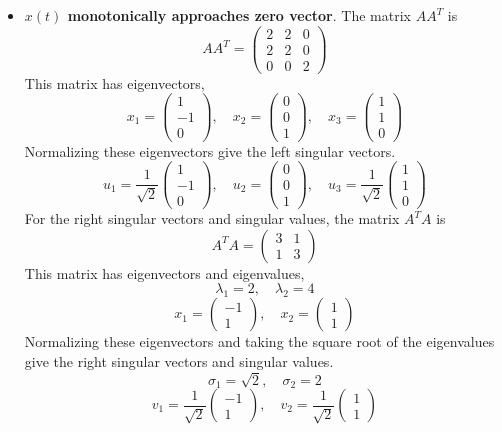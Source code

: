 \documentclass{article}
\begin{document}
\begin{itemize}
  \item {\bf $x(t)$ monotonically approaches zero vector}. The matrix $A A^T$
  is
  $$ A A^T = \begin{pmatrix}
    2 & 2 & 0 \\
    2 & 2 & 0 \\
    0 & 0 & 2
  \end{pmatrix} $$
  This matrix has eigenvectors,
  $$ x_1 = \begin{pmatrix}
    1 \\
    -1 \\
    0
  \end{pmatrix},\quad x_2 = \begin{pmatrix}
    0 \\
    0 \\
    1
  \end{pmatrix},\quad x_3 = \begin{pmatrix}
    1 \\
    1 \\
    0
  \end{pmatrix} $$
  Normalizing these eigenvectors give the left singular vectors. 
  $$ u_1 = \frac{1}{\sqrt{2}}\begin{pmatrix}
    1 \\
    -1 \\
    0
  \end{pmatrix},\quad u_2 = \begin{pmatrix}
    0 \\
    0 \\
    1
  \end{pmatrix},\quad u_3 = \frac{1}{\sqrt{2}}\begin{pmatrix}
    1 \\
    1 \\
    0
  \end{pmatrix} $$
  For the right singular vectors and singular values, the matrix $A^T A$ is
  $$ A^T A = \begin{pmatrix}
    3 & 1 \\
    1 & 3
  \end{pmatrix} $$
  This matrix has eigenvectors and eigenvalues,
  $$ \lambda_1 = 2,\quad \lambda_2 = 4 $$
  $$ x_1 = \begin{pmatrix}
    -1 \\
    1
  \end{pmatrix},\quad x_2 = \begin{pmatrix}
    1 \\
    1
  \end{pmatrix} $$
  Normalizing these eigenvectors and taking the square root of the
  eigenvalues give the right singular vectors and singular values.
  $$ \sigma_1 = \sqrt{2},\quad \sigma_2 = 2 $$
  $$ v_1 = \frac{1}{\sqrt{2}}\begin{pmatrix}
    -1 \\
    1
  \end{pmatrix},\quad v_2 = \frac{1}{\sqrt{2}}\begin{pmatrix}
    1 \\
    1
  \end{pmatrix} $$

\end{itemize}
\end{document}

